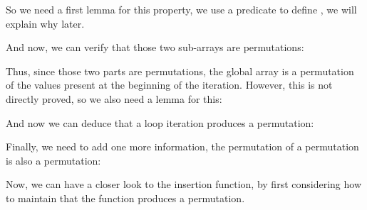 
So we need a first lemma for this property, we use a predicate
 to define , we will explain why
later.


And now, we can verify that those two sub-arrays are permutations:




Thus, since those two parts are permutations, the global array is a permutation
of the values present at the beginning of the iteration. However, this is not
directly proved, so we also need a lemma for this:





And now we can deduce that a loop iteration produces a permutation:






Finally, we need to add one more information, the permutation of a permutation
is also a permutation:






Now, we can have a closer look to the insertion function, by first considering
how to maintain that the function produces a permutation.




